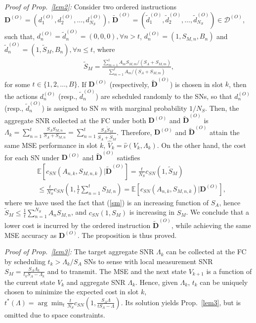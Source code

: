\documentclass[10pt,twocolumn,twoside]{IEEEtran}
\theoremstyle{plain}
\begin{document}
\noindent\emph{Proof of Prop.~\ref{lem2}:}
Consider two ordered instructions $\mathbf D^{(O)}=(d_{1}^{(O)},d_{2}^{(O)},\dots,d_{N_S}^{(O)})$, $\tilde{\mathbf D}^{(O)}{=}(\tilde d_{1}^{(O)},\tilde d_{2}^{(O)},\dots,\tilde d_{N_S}^{(O)}){\in}\mathcal D^{(O)}$, such that,
$d_{n}^{(O)}{=}\tilde d_{n}^{(O)}{=}(0,0,0),\forall n>t$,
 $d_{n}^{(O)}=(1,S_{M,n},B_n)$ and $\tilde d_{n}^{(O)}=(1,\tilde S_{M},B_n),\forall n\leq t$, where
 \begin{align}
\label{sm}
\tilde S_{M}=
\frac{
\sum_{m=1}^{t}A_mS_{M,m}/(S_A+S_{M,m})
}
{
\sum_{m=1}^{t}A_m/(S_A+S_{M,m})
},
\end{align}
for some $t\in\{1,2,\dots,B\}$.
If ${\mathbf D}^{(O)}$ (respectively, $\tilde{\mathbf D}^{(O)}$) is chosen in slot $k$,
then the actions $d_{n}^{(O)}$ (resp., $\tilde d_{n}^{(O)}$) are scheduled randomly to the SNs,
so that $d_n^{(O)}$ (resp., $\tilde d_{n}^{(O)}$) is assigned to SN $m$ with marginal probability $1/N_S$.
 Then,
 the aggregate SNR collected at the FC under both ${\mathbf D}^{(O)}$ and $\tilde{\mathbf D}^{(O)}$ is $\Lambda_k=\sum_{n=1}^{t}\frac{S_AS_{M,n}}{S_A+S_{M,n}}=\sum_{n=1}^{t}\frac{S_A\tilde S_{M}}{S_A+\tilde S_{M}}$.
Therefore, ${\mathbf D}^{(O)}$ and $\tilde{\mathbf D}^{(O)}$ attain the same MSE performance in slot $k$, $\hat V_k=\hat \nu(V_{k},\Lambda_k)$.
On the other hand,
 the cost for each SN under ${\mathbf D}^{(O)}$ and $\tilde{\mathbf D}^{(O)}$ satisfies
 \begin{align}
&
\mathbb E[c_{SN}(A_{n,k},S_{M,n,k})|\tilde{\mathbf D}^{(O)}]
=
\frac{t}{N_S}c_{SN}(1,\tilde S_{M})
\\&\nonumber
\leq
\frac{t}{N_S}c_{SN}\left(1,\frac{1}{t}\sum_{n=1}^{t}S_{M,n}\right)
=\mathbb E[c_{SN}(A_{n,k},S_{M,n,k})|{\mathbf D}^{(O)}],
\end{align}
where we have used the fact that (\ref{sm}) is an increasing function of $S_A$, hence $\tilde S_{M}\leq\frac{1}{t}\sum_{n=1}^{N_S}A_nS_{M,n}$,
and $c_{SN}\left(1,S_M\right)$ is increasing in $S_M$.
We conclude that a lower cost is incurred by the ordered
instruction $\tilde{\mathbf D}^{(O)}$, while achieving the same MSE accuracy as $\mathbf D^{(O)}$. The proposition is thus proved.
\hfill\QED

\noindent\emph{Proof of Prop.~\ref{lem3}:}
The target aggregate SNR $\Lambda_k$
 can be collected at the FC by scheduling $t_k>\Lambda_k/S_A$ SNs to
sense with local measurement SNR $S_M=\frac{S_A\Lambda_k}{t_kS_A-\Lambda_k}$ and to transmit.
The MSE and the next state $V_{k+1}$ is a function of the current state $V_k$ and aggregate SNR $\Lambda_k$.
Hence, given $\Lambda_k$, $t_k$ can be uniquely chosen to minimize the expected cost in slot $k$,
 $t^*(\Lambda)=\arg\min_{t}
 \frac{t}{N_S}c_{SN}\left(1,\frac{S_A\Lambda}{tS_A-\Lambda}\right)$.
Its solution yields Prop.~\ref{lem3}, but is omitted due to space constraints.
\hfill\QED
\end{document}
